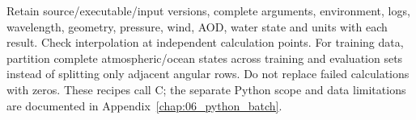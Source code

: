 Retain source/executable/input versions, complete arguments, environment, logs, wavelength, geometry, pressure, wind, AOD, water state and units with each result. Check interpolation at independent calculation points. For training data, partition complete atmospheric/ocean states across training and evaluation sets instead of splitting only adjacent angular rows. Do not replace failed calculations with zeros. These recipes call C; the separate Python scope and data limitations are documented in Appendix~\ref{chap:06_python_batch}.
